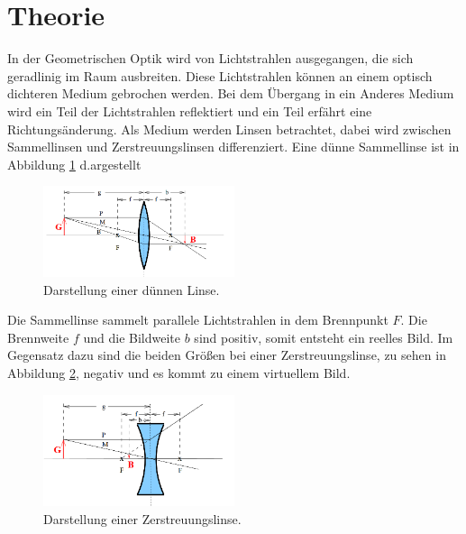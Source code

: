 \section{Theorie}
\label{sec:Theorie}
In der Geometrischen Optik wird von Lichtstrahlen ausgegangen, die sich geradlinig im Raum ausbreiten.
Diese Lichtstrahlen können an einem optisch dichteren Medium gebrochen werden.
Bei dem Übergang in ein Anderes Medium wird ein Teil der Lichtstrahlen reflektiert und ein Teil erfährt eine
Richtungsänderung.
Als Medium werden Linsen betrachtet, dabei wird zwischen Sammellinsen und Zerstreuungslinsen
differenziert.
Eine dünne Sammellinse ist in Abbildung \ref{fig:duenn} d.argestellt
\begin{figure}
 \centering
 \includegraphics[width=0.5\textwidth]{duenn.png}
 \caption{Darstellung einer dünnen Linse.\cite{sample}}
 \label{fig:duenn}
 \end{figure}
Die Sammellinse sammelt parallele Lichtstrahlen in dem Brennpunkt $F$. Die Brennweite $f$ und die Bildweite $b$
sind positiv, somit entsteht ein reelles Bild. Im Gegensatz dazu sind die beiden Größen bei einer Zerstreuungslinse,
zu sehen in Abbildung \ref{fig:streu}, negativ und es kommt zu einem virtuellem Bild.
\begin{figure}
 \centering
 \includegraphics[width=0.5\textwidth]{streu.png}
 \caption{Darstellung einer Zerstreuungslinse.\cite{sample}}
 \label{fig:streu}
 \end{figure}

